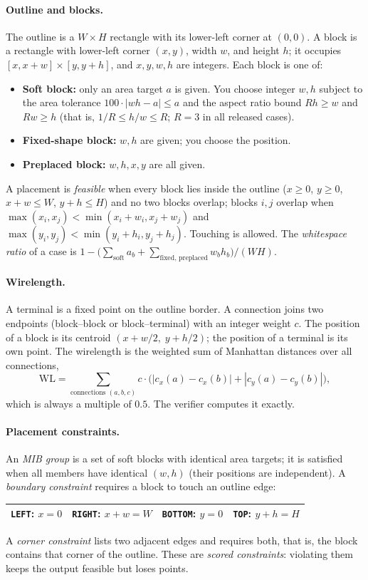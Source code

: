 \documentclass[11pt,a4paper]{article}
\newcommand{\kw}[1]{\texttt{#1}}
\begin{document}
\paragraph{Outline and blocks.} The outline is a $W \times H$ rectangle with
its lower-left corner at $(0,0)$. A block is a rectangle with lower-left corner
$(x,y)$, width $w$, and height $h$; it occupies $[x,x+w]\times[y,y+h]$, and
$x,y,w,h$ are integers. Each block is one of:
\begin{itemize}
  \item \textbf{Soft block:} only an area target $a$ is given. You choose
        integer $w,h$ subject to the area tolerance $100\cdot|wh-a|\le a$ and
        the aspect ratio bound $Rh\ge w$ and $Rw\ge h$ (that is,
        $1/R\le h/w\le R$; $R=3$ in all released cases).
  \item \textbf{Fixed-shape block:} $w,h$ are given; you choose the position.
  \item \textbf{Preplaced block:} $w,h,x,y$ are all given.
\end{itemize}
A placement is \emph{feasible} when every block lies inside the outline
($x\ge0$, $y\ge0$, $x+w\le W$, $y+h\le H$) and no two blocks overlap; blocks
$i,j$ overlap when $\max(x_i,x_j)<\min(x_i+w_i,x_j+w_j)$ and
$\max(y_i,y_j)<\min(y_i+h_i,y_j+h_j)$. Touching is allowed. The
\emph{whitespace ratio} of a case is
$1-\bigl(\sum_{\text{soft}} a_b+\sum_{\text{fixed, preplaced}} w_b h_b\bigr)/(WH)$.

\paragraph{Wirelength.} A terminal is a fixed point on the outline border. A
connection joins two endpoints (block--block or block--terminal) with an
integer weight $c$. The position of a block is its centroid
$(x+w/2,\;y+h/2)$; the position of a terminal is its own point. The wirelength
is the weighted sum of Manhattan distances over all connections,
\[
  \mathrm{WL}=\sum_{\text{connections }(a,b,c)}
  c\cdot\bigl(|c_x(a)-c_x(b)|+|c_y(a)-c_y(b)|\bigr),
\]
which is always a multiple of $0.5$. The verifier computes it exactly.

\paragraph{Placement constraints.} An \emph{MIB group} is a set of soft blocks
with identical area targets; it is satisfied when all members have identical
$(w,h)$ (their positions are independent). A \emph{boundary constraint}
requires a block to touch an outline edge:
\begin{center}
\begin{tabular}{llll}
  \toprule
  \kw{LEFT}: $x=0$ & \kw{RIGHT}: $x+w=W$ & \kw{BOTTOM}: $y=0$ & \kw{TOP}: $y+h=H$ \\
  \bottomrule
\end{tabular}
\end{center}
A \emph{corner constraint} lists two adjacent edges and requires both, that is,
the block contains that corner of the outline. These are \emph{scored
constraints}: violating them keeps the output feasible but loses points.
\end{document}
